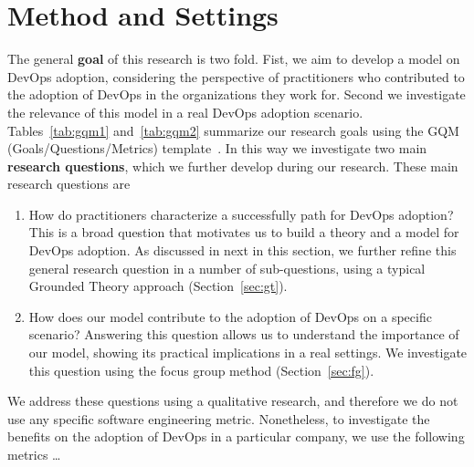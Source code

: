 \section{Method and Settings} 

{\color{blue}The general {\bf goal} of this research is two fold.
  Fist, we aim to develop 
  a model on DevOps adoption, considering the perspective of practitioners who
  contributed to the adoption of DevOps in the
  organizations they work for. Second we investigate the relevance
  of this model in a real DevOps adoption scenario.
  Tables~\ref{tab:gqm1} and~\ref{tab:gqm2} summarize our
  research goals using the GQM (Goals/Questions/Metrics)
  template~\cite{wohlin:book}.
  In this way 
  we investigate two main {\bf research questions}, which we
  further develop during our research. These main research
  questions are}

\begin{enumerate}[(RQ1)]
 \item How do practitioners characterize a successfully path
   for DevOps adoption? This is a broad question that motivates 
   us to build a theory and a model for DevOps adoption. As discussed
   in next in this section, we further refine this general research question
   in a number of sub-questions, using a typical Grounded Theory approach
   (Section~\ref{sec:gt}).

 \item How does our model contribute to the adoption of DevOps on a
   specific scenario? Answering this question allows us to understand
   the importance of our model, showing its practical implications
   in a real settings. We investigate this question using the
   focus group method (Section~\ref{sec:fg}). 
\end{enumerate}

We address these questions using a qualitative research, and
therefore we do not use any specific software engineering
metric. {\color{red}Nonetheless, to investigate the
benefits on the adoption of DevOps in a particular
company, we use the following metrics \ldots}

